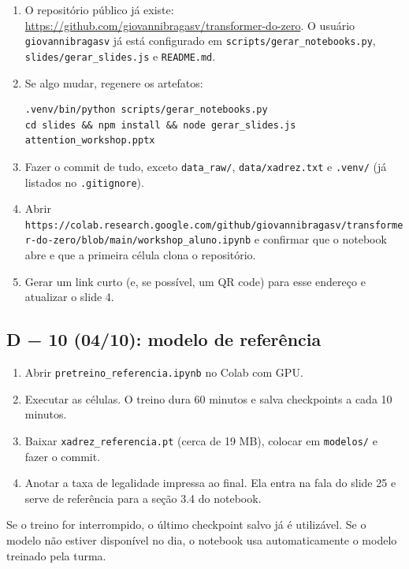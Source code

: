 \documentclass[
  11pt,
]{article}
\providecommand{\tightlist}{%
  \setlength{\itemsep}{0pt}\setlength{\parskip}{0pt}}
\begin{document}
\begin{enumerate}
\def\labelenumi{\arabic{enumi}.}
\item
  O repositório público já existe:
  \url{https://github.com/giovannibragasv/transformer-do-zero}. O
  usuário \texttt{giovannibragasv} já está configurado em
  \texttt{scripts/gerar\_notebooks.py}, \texttt{slides/gerar\_slides.js}
  e \texttt{README.md}.
\item
  Se algo mudar, regenere os artefatos:

\begin{verbatim}
.venv/bin/python scripts/gerar_notebooks.py
cd slides && npm install && node gerar_slides.js attention_workshop.pptx
\end{verbatim}
\item
  Fazer o commit de tudo, exceto \texttt{data\_raw/},
  \texttt{data/xadrez.txt} e \texttt{.venv/} (já listados no
  \texttt{.gitignore}).
\item
  Abrir
  \texttt{https://colab.research.google.com/github/giovannibragasv/transformer-do-zero/blob/main/workshop\_aluno.ipynb}
  e confirmar que o notebook abre e que a primeira célula clona o
  repositório.
\item
  Gerar um link curto (e, se possível, um QR code) para esse endereço e
  atualizar o slide 4.
\end{enumerate}

\subsection{D − 10 (04/10): modelo de
referência}\label{d-10-0410-modelo-de-referuxeancia}

\begin{enumerate}
\def\labelenumi{\arabic{enumi}.}
\tightlist
\item
  Abrir \texttt{pretreino\_referencia.ipynb} no Colab com GPU.
\item
  Executar as células. O treino dura 60 minutos e salva checkpoints a
  cada 10 minutos.
\item
  Baixar \texttt{xadrez\_referencia.pt} (cerca de 19 MB), colocar em
  \texttt{modelos/} e fazer o commit.
\item
  Anotar a taxa de legalidade impressa ao final. Ela entra na fala do
  slide 25 e serve de referência para a seção 3.4 do notebook.
\end{enumerate}

Se o treino for interrompido, o último checkpoint salvo já é utilizável.
Se o modelo não estiver disponível no dia, o notebook usa
automaticamente o modelo treinado pela turma.
\end{document}
